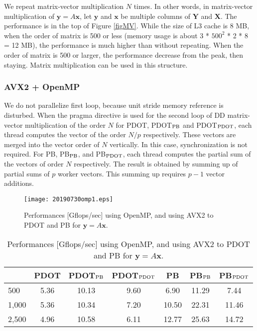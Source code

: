 \documentclass{IOS-Book-Article}
\begin{document}
We repeat matrix-vector multiplication $N$ times. In other words, in matrix-vector multiplication of $\bm{y} = A\bm{x}$, let $\bm{y}$ and $\bm{x}$ be multiple columns of $\bm{Y}$ and $\bm{X}$. The performance is in the top of Figure \ref{figMV}.
While the size of L3 cache is 8 MB, when the order of matrix is 500 or less (memory usage is about 3 * $500^2$ * 2 * 8 = 12 MB), the performance is much higher than without repeating. 
When the order of matrix is 500 or larger, the performance decrease from the peak, then staying. Matrix multiplication can be used in this structure.

\subsubsection{AVX2 + OpenMP}
We do not parallelize first loop, because unit stride memory reference is disturbed. When the pragma directive is used for the second loop of DD matrix-vector multiplication of the order $N$ for PDOT, PDOT$_{\rm{PB}}$ and PDOT$_{\rm{PDOT}}$, each thread computes the vector of the order $N/p$ respectively. These vectors are merged into the vector order of $N$ vertically. In this case, synchronization is not required. For PB, PB$_{\rm{PB}}$, and PB$_{\rm{PDOT}}$, each thread computes the partial sum of the vectors of order $N$ respectively. The result is obtained by summing up of partial sums of $p$ worker vectors. This summing up requires $p-1$ vector additions.

\begin{figure}[htbp]
  \begin{center}
    \texttt{[image: 20190730omp1.eps]}
        \caption{Performances [Gflops/sec] using OpenMP, and using AVX2 to PDOT and PB for $\bm{y} = A\bm{x}$.}
    \label{figMM}
  \end{center}
\end{figure}

\begin{table}[htbp]
\centering
\footnotesize
\caption{Performances [Gflops/sec] using OpenMP, and using AVX2 to PDOT and PB for $\bm{y} = A\bm{x}$.}
\label{MVomp}
\begin{tabular}{l||c|cc||c|cc}
\hline
                       & PDOT    & PDOT$_{\rm{PB}}$       & PDOT$_{\rm{PDOT}}$      & PB   & PB$_{\rm{PB}}$        & PB$_{\rm{PDOT}}$       \\ \hline
\multirow{1}{*}{500}   & 5.36 & 10.13 & 9.60 & 6.90 & 11.29   & 7.44  \\  
\multirow{1}{*}{1,000} & 5.36 & 10.34 & 7.20 & 10.50 & 22.31 & 11.46  \\
\multirow{1}{*}{2,500} & 4.96 & 10.58 & 6.11 & 12.77 & 25.63  & 14.72 \\ \hline
\end{tabular}
\end{table}
\end{document}
